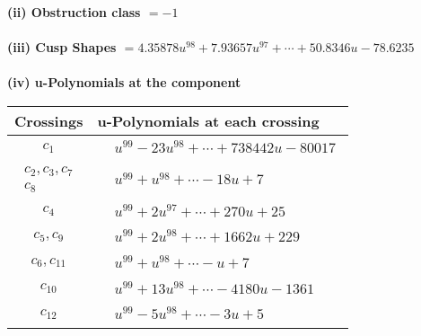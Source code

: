 \documentclass[1p]{elsarticle_modified}
\theoremstyle{definition}
\begin{document}
\flushleft \textbf{(ii) Obstruction class $= -1$}\\~\\
\flushleft \textbf{(iii) Cusp Shapes $= 4.35878 u^{98}+7.93657 u^{97}+\cdots+50.8346 u-78.6235$}\\~\\
\newpage\renewcommand{\arraystretch}{1}
\flushleft \textbf{(iv) u-Polynomials at the component}\newline \\
\begin{tabular}{m{50pt}|m{274pt}}
Crossings & \hspace{64pt}u-Polynomials at each crossing \\
\hline $$\begin{aligned}c_{1}\end{aligned}$$&$\begin{aligned}
&u^{99}-23 u^{98}+\cdots+738442 u-80017
\end{aligned}$\\
\hline $$\begin{aligned}c_{2},c_{3},c_{7}\\c_{8}\end{aligned}$$&$\begin{aligned}
&u^{99}+u^{98}+\cdots-18 u+7
\end{aligned}$\\
\hline $$\begin{aligned}c_{4}\end{aligned}$$&$\begin{aligned}
&u^{99}+2 u^{97}+\cdots+270 u+25
\end{aligned}$\\
\hline $$\begin{aligned}c_{5},c_{9}\end{aligned}$$&$\begin{aligned}
&u^{99}+2 u^{98}+\cdots+1662 u+229
\end{aligned}$\\
\hline $$\begin{aligned}c_{6},c_{11}\end{aligned}$$&$\begin{aligned}
&u^{99}+u^{98}+\cdots- u+7
\end{aligned}$\\
\hline $$\begin{aligned}c_{10}\end{aligned}$$&$\begin{aligned}
&u^{99}+13 u^{98}+\cdots-4180 u-1361
\end{aligned}$\\
\hline $$\begin{aligned}c_{12}\end{aligned}$$&$\begin{aligned}
&u^{99}-5 u^{98}+\cdots-3 u+5
\end{aligned}$\\
\hline
\end{tabular}\\~\\
\end{document}
